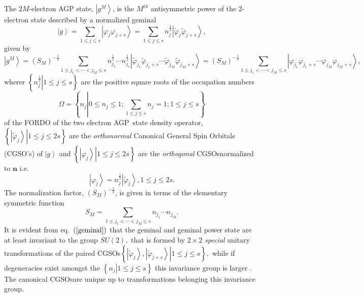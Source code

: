 \documentclass[aps,preprint]{revtex4}%
\begin{document}
The $2M$-electron AGP state, $\left\vert g^{M}\right\rangle $, is the $M^{th}$
antisymmetric power of the $2$-electron state described by a normalized
geminal
\begin{equation}
\left\vert g\right\rangle =\sum_{1\leq j\leq s}\left\vert \varphi_{j}%
\varphi_{j+s}\right\rangle =\sum_{1\leq j\leq s}n_{j}^{\frac{1}{2}}\left\vert
\tilde{\varphi}_{j}\tilde{\varphi}_{j+s}\right\rangle , \label{geminal}%
\end{equation}
given by
\begin{equation}
\left\vert g^{M}\right\rangle =\left(  S_{M}\right)  ^{-\frac{1}{2}}%
\sum_{1\leq j_{1}<\cdots<j_{M}\leq s}n_{j_{1}}^{\frac{1}{2}}\cdots n_{j_{s}%
}^{\frac{1}{2}}\left\vert \tilde{\varphi}_{j_{1}}\tilde{\varphi}_{j_{1}%
+s}\cdots\tilde{\varphi}_{j_{M}}\tilde{\varphi}_{j_{M}+s}\right\rangle
=\left(  S_{M}\right)  ^{-\frac{1}{2}}\sum_{1\leq j_{1}<\cdots<j_{M}\leq
s}\left\vert \varphi_{j_{1}}\varphi_{j_{1}+s}\cdots\varphi_{j_{M}}%
\varphi_{j_{M}+s}\right\rangle , \label{agp}%
\end{equation}
wherer $\left\{  \left.  n_{j}^{\frac{1}{2}}\right\vert 1\leq j\leq s\right\}
$ are the positive square roots of the occupation numbers%
\begin{equation}
\Omega=\left\{  n_{j}\left\vert 0\leq n_{j}\leq1;\sum_{1\leq j\leq s}%
n_{j}=1;1\leq j\leq s\right.  \right\}
\end{equation}
of the FORDO of the two electron AGP\ state density operator, $\left\{
\left.  \left\vert \tilde{\varphi}_{j}\right\rangle \right\vert 1\leq
j\leq2s\right\}  $ are the \emph{orthonormal} Canonical General Spin Orbitals
(CGSO's) of $\left\vert g\right\rangle $ and $\left\{  \left.  \left\vert
\varphi_{j}\right\rangle \right\vert 1\leq j\leq2s\right\}  $ are the
\emph{orthogonal} CGSOsnormalized to $\boldsymbol{n}$ i.e.
\begin{equation}
\left\vert \varphi_{j}\right\rangle =n_{j}^{\frac{1}{2}}\left\vert
\tilde{\varphi}_{j}\right\rangle ,1\leq j\leq2s.
\end{equation}
The normalization factor, $\left(  S_{M}\right)  ^{-\frac{1}{2}}$, is given in
terms of the elementary symmetric function
\begin{equation}
S_{M}=\sum_{1\leq j_{1}<\cdots<j_{M}\leq s}n_{j_{1}}\cdots n_{j_{M}}.
\end{equation}
It is evident from eq.\ $\left(  \ref{geminal}\right)  $ that the geminal and
geminal power state are at least invariant to the group $SU\left(  2\right)
,$ that is formed by $2\times2$ \emph{special} unitary transformations of the
paired CGSOs$\left\{  \left.  \left\vert \tilde{\varphi}_{j}\right\rangle
,\left\vert \tilde{\varphi}_{j+s}\right\rangle \right\vert 1\leq j\leq
s\right\}  ,$ while if degeneracies exist amongst the $\left\{  \left.
n_{j}\right\vert 1\leq j\leq s\right\}  $ this invariance group is larger
\cite{AGPCoherent}. The canonical CGSOsare unique up to transformations
belonging this invariance group.
\end{document}
